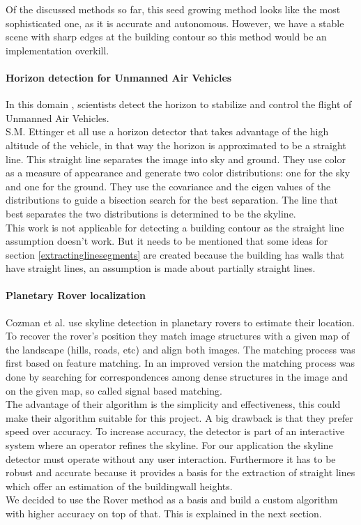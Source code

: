 Of the discussed methods so far, this seed growing method looks like the most sophisticated one, as
it is accurate and autonomous. However, we have a stable scene with sharp edges
at the building contour so this method would be an implementation overkill.  


\paragraph{Horizon detection for Unmanned Air Vehicles}
In this domain \cite{Guidedflight}, scientists detect the horizon to stabilize and control the
flight of Unmanned Air Vehicles.\\  
S.M. Ettinger et all \cite{Guidedflight} use a horizon detector that takes
advantage of the high altitude of the vehicle, in that way the horizon is
approximated to be a straight line.  
This straight line separates the image into sky and ground. They use color as
a measure of appearance and generate two color distributions: one for the sky
and one for the ground. They use the covariance and the eigen values of the
distributions to guide a bisection search for the best separation. The line that
best separates the two distributions is determined to be the skyline.\\

This work is not applicable for detecting a building contour as the straight
line assumption doesn't work.  But it needs to be mentioned that some ideas for
section \ref{extractinglinesegments} are created because the building has walls
that have straight lines, an assumption is made about partially straight lines.

\paragraph{Planetary Rover localization}
Cozman et al. \cite{Rover} use skyline detection in planetary rovers to estimate 
their location.  
To recover the rover's position they match image structures with a given map
of the landscape (hills, roads, etc) and align both images.
The matching process was first based on feature matching. In an improved version
the matching process was done by searching for correspondences among dense
structures in the image and on the given map, so called signal based matching.\\
The advantage of their algorithm is the simplicity and effectiveness, this
could make their algorithm suitable for this project.  A big drawback is that
they prefer speed over accuracy.  To increase accuracy, the detector is part
of an interactive system where an operator refines the skyline.  For our
application the skyline detector must operate without any user interaction.
Furthermore it has to be robust and accurate because it provides a basis for
the extraction of straight lines which offer an estimation of the buildingwall
heights.\\
We decided to use the Rover method \cite{Rover} as a basis and 
build a custom algorithm with higher accuracy on top of that. This is explained
in the next section.


